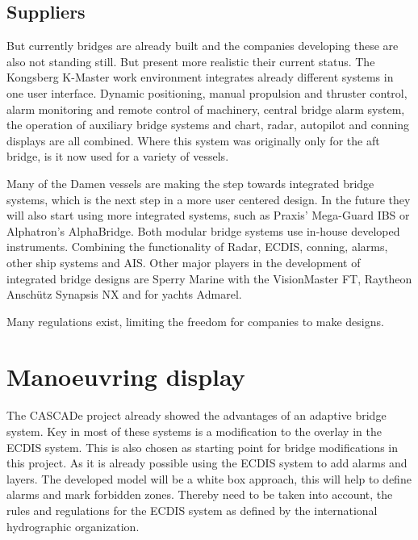 

\subsection{Suppliers}
But currently bridges are already built and the companies developing these are also not standing still. But present more realistic their current status. The Kongsberg K-Master work environment integrates already different systems in one user interface. Dynamic positioning, manual propulsion and thruster control, alarm monitoring and remote control of machinery, central bridge alarm system, the operation of auxiliary bridge systems and chart, radar, autopilot and conning displays are all combined. Where this system was originally only for the aft bridge, is it now used for a variety of vessels. \cite{Kongsberg2017}

Many of the Damen vessels are making the step towards integrated bridge systems, which is the next step in a more user centered design. In the future they will also start using more integrated systems, such as Praxis' Mega-Guard IBS or Alphatron's AlphaBridge. Both modular bridge systems use in-house developed instruments. Combining the functionality of Radar, \ac{ECDIS}, conning, alarms, other ship systems and \ac{AIS}. 
Other major players in the development of integrated bridge designs are Sperry Marine with the VisionMaster FT, Raytheon Anschütz Synapsis NX and for yachts Admarel.

Many regulations exist, limiting the freedom for companies to make designs. 

\section{Manoeuvring display}
The CASCADe project already showed the advantages of an adaptive bridge system. Key in most of these systems is a modification to the overlay in the \ac{ECDIS} system. This is also chosen as starting point for bridge modifications in this project. As it is already possible using the \ac{ECDIS} system to add alarms and layers. The developed model will be a white box approach, this will help to define alarms and mark forbidden zones. Thereby need to be taken into account, the rules and regulations for the \ac{ECDIS} system as defined by the international hydrographic organization.

